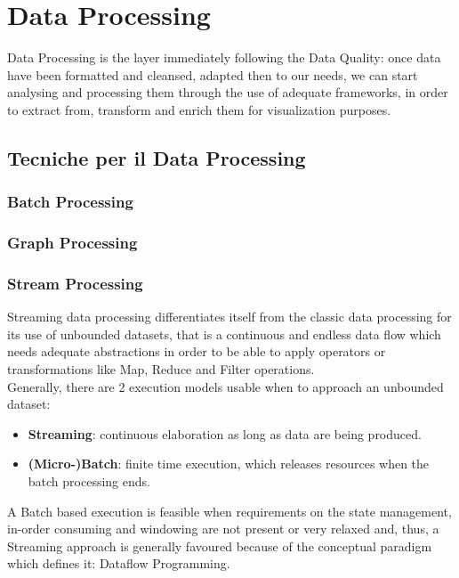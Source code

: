\chapter{Data Processing}

Data Processing is the layer immediately following the Data Quality: once data have been formatted and cleansed, adapted then to our needs, we can start analysing and processing them through the use of adequate frameworks, in order to extract from, transform and enrich them for visualization purposes.\\

\section{Tecniche per il Data Processing}

\subsection{Batch Processing} \label{BatchProc}

\subsection{Graph Processing} \label{GraphProc}

\subsection{Stream Processing} \label{StreamProc}

Streaming data processing differentiates itself from the classic data processing for its use of unbounded datasets, that is a continuous and endless data flow which needs adequate abstractions in order to be able to apply operators or transformations like Map, Reduce and Filter operations. \\ 

Generally, there are 2 execution models usable when to approach an unbounded dataset:

\begin{itemize}
    \item \textbf{Streaming}: continuous elaboration as long as data are being produced.
    \item \textbf{(Micro-)Batch}: finite time execution, which releases resources when the batch processing ends.
\end{itemize}

A Batch based execution is feasible when requirements on the state management, in-order consuming and windowing are not present or very relaxed and, thus, a Streaming approach is generally favoured because of the conceptual paradigm which defines it: Dataflow Programming.

